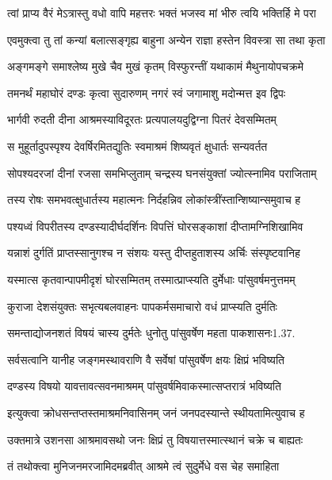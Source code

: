 \twolineshloka
{त्वां प्राप्य वैरं मेऽत्रास्तु वधो वापि महत्तरः}
{भक्तं भजस्व मां भीरु त्वयि भक्तिर्हि मे परा}%

\twolineshloka
{एवमुक्त्वा तु तां कन्यां बलात्सङ्गृह्य बाहुना}
{अन्येन राज्ञा हस्तेन विवस्त्रा सा तथा कृता}%

\twolineshloka
{अङ्गमङ्गे समाश्लेष्य मुखे चैव मुखं कृतम्}
{विस्फुरन्तीं यथाकामं मैथुनायोपचक्रमे}%

\twolineshloka
{तमनर्थं महाघोरं दण्डः कृत्वा सुदारुणम्}
{नगरं स्वं जगामाशु मदोन्मत्त इव द्विपः}%

\twolineshloka
{भार्गवी रुदती दीना आश्रमस्याविदूरतः}
{प्रत्यपालयदुद्विग्ना पितरं देवसम्मितम्}%

\twolineshloka
{स मुहूर्तादुपस्पृश्य देवर्षिरमितद्युतिः}
{स्वमाश्रमं शिष्यवृतं क्षुधार्तः सन्यवर्तत}%

\twolineshloka
{सोपश्यदरजां दीनां रजसा समभिप्लुताम्}
{चन्द्रस्य घनसंयुक्तां ज्योत्स्नामिव पराजिताम्}%

\twolineshloka
{तस्य रोषः समभवत्क्षुधार्तस्य महात्मनः}
{निर्दहन्निव लोकांस्त्रींस्तान्शिष्यान्समुवाच ह}%

\twolineshloka
{पश्यध्वं विपरीतस्य दण्डस्यादीर्घदर्शिनः}
{विपत्तिं घोरसङ्काशां दीप्तामग्निशिखामिव}%

\twolineshloka
{यन्नाशं दुर्गतिं प्राप्तस्सानुगश्च न संशयः}
{यस्तु दीप्तहुताशस्य अर्चिः संस्पृष्टवानिह}%

\twolineshloka
{यस्मात्स कृतवान्पापमीदृशं घोरसम्मितम्}
{तस्मात्प्राप्स्यति दुर्मेधाः पांसुवर्षमनुत्तमम्}%

\twolineshloka
{कुराजा देशसंयुक्तः सभृत्यबलवाहनः}
{पापकर्मसमाचारो वधं प्राप्स्यति दुर्मतिः}%

\twolineshloka
{समन्ताद्योजनशतं विषयं चास्य दुर्मतेः}
{धुनोतु पांसुवर्षेण महता पाकशासनः1.37.}%

\twolineshloka
{सर्वसत्वानि यानीह जङ्गमस्थावराणि वै}
{सर्वेषां पांसुवर्षेण क्षयः क्षिप्रं भविष्यति}%

\twolineshloka
{दण्डस्य विषयो यावत्तावत्सवनमाश्रमम्}
{पांसुवर्षमिवाकस्मात्सप्तरात्रं भविष्यति}%

\twolineshloka
{इत्युक्त्वा क्रोधसन्तप्तस्तमाश्रमनिवासिनम्}
{जनं जनपदस्यान्ते स्थीयतामित्युवाच ह}%

\twolineshloka
{उक्तमात्रे उशनसा आश्रमावसथो जनः}
{क्षिप्रं तु विषयात्तस्मात्स्थानं चक्रे च बाह्यतः}%

\twolineshloka
{तं तथोक्त्वा मुनिजनमरजामिदमब्रवीत्}
{आश्रमे त्वं सुदुर्मेधे वस चेह समाहिता}%

